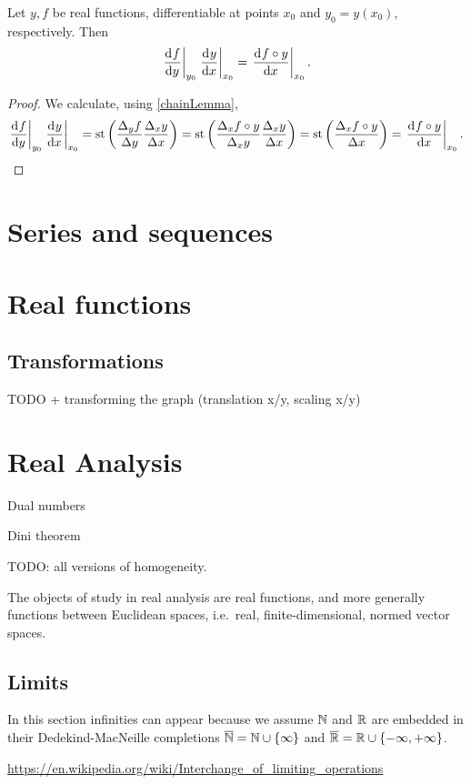 \begin{proposition}
Let $y,f$ be real functions, differentiable at points $x_0$ and $y_0=y(x_0)$, respectively. Then
\[ \left.\mathinner{ \dfrac{\operatorname{d \!}{^{}}f}{\operatorname{d \!}{{y}^{}}} }\right|_{y_0} \left.\mathinner{ \dfrac{\operatorname{d \!}{^{}}y}{\operatorname{d \!}{{x}^{}}} }\right|_{x_0} = \left.\mathinner{ \dfrac{\operatorname{d \!}{^{}}f\circ y}{\operatorname{d \!}{{x}^{}}} }\right|_{x_0}. \]
\end{proposition}
\begin{proof}
We calculate, using \ref{chainLemma},
\[ \left.\mathinner{ \dfrac{\operatorname{d \!}{^{}}f}{\operatorname{d \!}{{y}^{}}} }\right|_{y_0} \left.\mathinner{ \dfrac{\operatorname{d \!}{^{}}y}{\operatorname{d \!}{{x}^{}}} }\right|_{x_0} = \operatorname{st}\left(\frac{\Delta_y f}{\Delta y}\frac{\Delta_x y}{\Delta x}\right) = \operatorname{st}\left(\frac{\Delta_x f\circ y}{\Delta_x y}\frac{\Delta_x y}{\Delta x}\right) = \operatorname{st}\left(\frac{\Delta_x f\circ y}{\Delta x}\right) = \left.\mathinner{ \dfrac{\operatorname{d \!}{^{}}f\circ y}{\operatorname{d \!}{{x}^{}}} }\right|_{x_0}. \]
\end{proof}

\chapter{Series and sequences}


\chapter{Real functions}

\section{Transformations}
TODO + transforming the graph (translation x/y, scaling x/y)

\chapter{Real Analysis}
Dual numbers

Dini theorem

TODO: all versions of homogeneity.

The objects of study in real analysis are real functions, and more generally functions between Euclidean spaces, i.e.\ real, finite-dimensional, normed vector spaces.

\section{Limits}
In this section infinities can appear because we assume $\mathbb{N}$ and $\mathbb{R}$ are embedded in their Dedekind-MacNeille completions $\overline{\mathbb{N}} = \mathbb{N}\cup\{\infty\}$ and $\overline{\mathbb{R}} = \mathbb{R}\cup\{-\infty, +\infty\}$.

\url{https://en.wikipedia.org/wiki/Interchange_of_limiting_operations}


